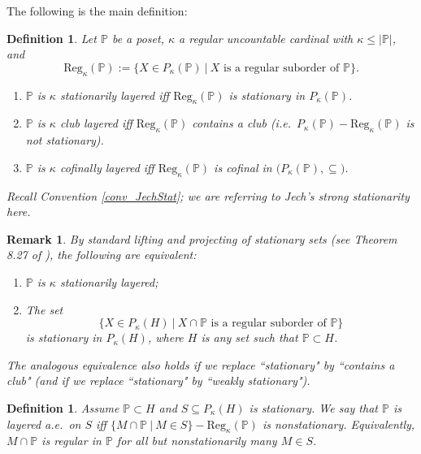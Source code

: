 \documentclass{amsart}
\newtheorem{definition}[theorem]{Definition}
\newtheorem{remark}[theorem]{Remark}
\begin{document}
The following is the main definition:
\begin{definition}\label{def_Layer}
Let $\mathbb{P}$ be a poset, $\kappa$ a regular uncountable cardinal with $\kappa \le |\mathbb{P}|$, and
\begin{equation*}
\text{Reg}_{\kappa}(\mathbb{P}):= \{  X \in P_\kappa(\mathbb{P}) \ | \  X \text{ is a regular suborder of } \mathbb{P} \}.
\end{equation*}

\begin{enumerate}
  \item $\mathbb{P}$ is \emph{$\kappa$ stationarily layered} iff $\text{Reg}_{\kappa}(\mathbb{P})$ is stationary in $P_\kappa(\mathbb{P})$.
  \item $\mathbb{P}$ is \emph{$\kappa$ club layered} iff $\text{Reg}_{\kappa}(\mathbb{P})$ contains a club (i.e.\ $P_\kappa(\mathbb{P}) - \text{Reg}_{\kappa}(\mathbb{P})$ is not stationary).
  \item $\mathbb{P}$ is \emph{$\kappa$ cofinally layered} iff $\text{Reg}_{\kappa}(\mathbb{P})$ is cofinal in $\big( P_\kappa(\mathbb{P}), \subseteq \big)$.
\end{enumerate}

Recall Convention \ref{conv_JechStat}; we are referring to Jech's strong stationarity here.
\end{definition}

\begin{remark}\label{rem_TFAE_statlayer}
By standard lifting and projecting of stationary sets (see Theorem 8.27 of \cite{MR1940513}), the following are equivalent:
\begin{enumerate}
 \item $\mathbb{P}$ is $\kappa$ stationarily layered;
 \item The set
 \begin{equation*}
 \{ X \in P_\kappa(H) \ | \  X \cap \mathbb{P} \text{ is a regular suborder of } \mathbb{P} \}
 \end{equation*}
 is stationary in $P_\kappa(H)$, where $H$ is any set such that $\mathbb{P} \subset H$. 
\end{enumerate}

The analogous equivalence also holds if we replace ``stationary" by ``contains a club" (and if we replace ``stationary" by ``weakly stationary").
\end{remark}

\begin{definition}
Assume $\mathbb{P} \subset H$ and $S \subseteq P_\kappa(H)$ is stationary.  We say that $\mathbb{P}$ is layered a.e.\ on $S$ iff $\{ M \cap \mathbb{P} \ | \ M \in S \} - \text{Reg}_{\kappa}(\mathbb{P})$ is nonstationary.  Equivalently, $M \cap \mathbb{P}$ is regular in $\mathbb{P}$ for all but nonstationarily many $M \in S$.
\end{definition}
\end{document}
